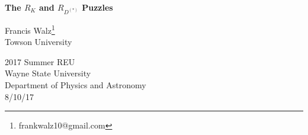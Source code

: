 \documentclass[12pt]{article}
\begin{document}
\begin{titlepage}
    \begin{center}
        \vspace*{1cm}
        
        \Huge
        \textbf{The $R_K$ and $R_{D^{(*)}}$ Puzzles}
        
        \vspace{0.5cm}
        \large
        
        \vspace{1.5cm}
        
        Francis Walz\footnote{frankwalz10@gmail.com}\\ Towson University
        
        \vfill
        
        \vspace{0.8cm}
        
        \Large
        2017 Summer REU\\
        Wayne State University\\
        Department of Physics and Astronomy\\
        8/10/17
        
    \end{center}
\end{titlepage}
\tableofcontents
\newpage
\end{document}
